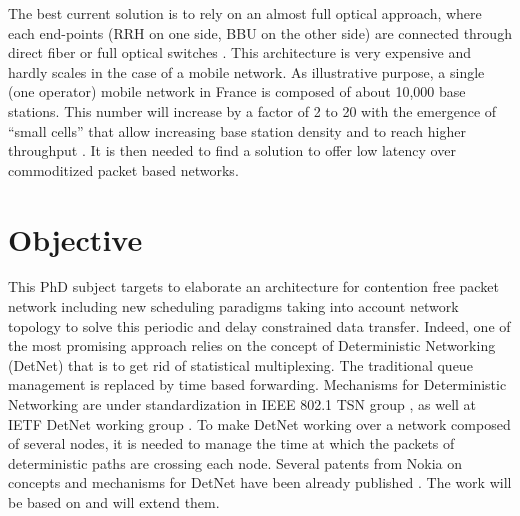 \documentclass{article}
\begin{document}
The best current solution is to rely on an almost full optical approach, where each end-points (RRH on one side, BBU on the other side) are connected through direct fiber or full optical switches \cite{5gppparchitecture}. This architecture is very expensive and hardly scales in the case of a mobile network. As illustrative purpose, a single (one operator) mobile network in France is composed of about 10,000 base stations. This number will increase by a factor of 2 to 20 with the emergence of “small cells” that allow increasing base station density and to reach higher throughput \cite{5gppparchitecture}. It is then needed to find a solution to offer low latency over commoditized packet based networks.\\ 

\section*{Objective}
This PhD subject targets to elaborate an architecture for contention free packet network including new scheduling  paradigms taking into account network topology to solve this periodic and delay constrained data transfer. Indeed, one of the most promising approach relies on the concept of Deterministic Networking (DetNet) that is to get rid of statistical multiplexing. The traditional queue management is replaced by time based forwarding. Mechanisms for Deterministic Networking are under standardization in IEEE 802.1 TSN group \cite{ieee802}, as well at IETF DetNet working group \cite{finn-detnet-architecture-08}.  To make DetNet working over a network composed of several nodes, it is needed to manage the time at which the packets of deterministic paths are crossing each node. Several patents from Nokia on concepts and mechanisms for DetNet have been  already   published \cite{howe2005time,leclerc2015contention,leclerc2016signaling,leclerc2016transmission,roos1994method,coherentflow}. The work will be based on and will extend them.\\
\end{document}
